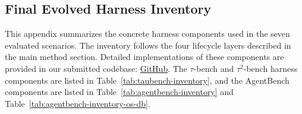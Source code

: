\subsection{Final Evolved Harness Inventory}
\label{app:harness-inventory}

This appendix summarizes the concrete harness components used in the seven evaluated scenarios. The inventory follows the four lifecycle layers described in the main method section. Detailed implementations of these components are provided in our submitted codebase: \href{https://github.com/Tianshi-Xu/Life-Harness}{GitHub}. The $\tau$-bench and $\tau^2$-bench harness components are listed in Table~\ref{tab:taubench-inventory}, and the AgentBench components are listed in Table~\ref{tab:agentbench-inventory} and Table~\ref{tab:agentbench-inventory-os-db}.

\begin{table}[t]
    \centering
    \huge
    \setlength{\tabcolsep}{4pt}
    \caption{
    Dataset statistics for harness evolution and evaluation.
    }
    \label{tab:data_statistics}
\end{table}

\begin{table}[t]
    \centering
    \caption{Evaluation sampling and interaction-budget settings.}
    \label{tab:eval-config}
\end{table}

